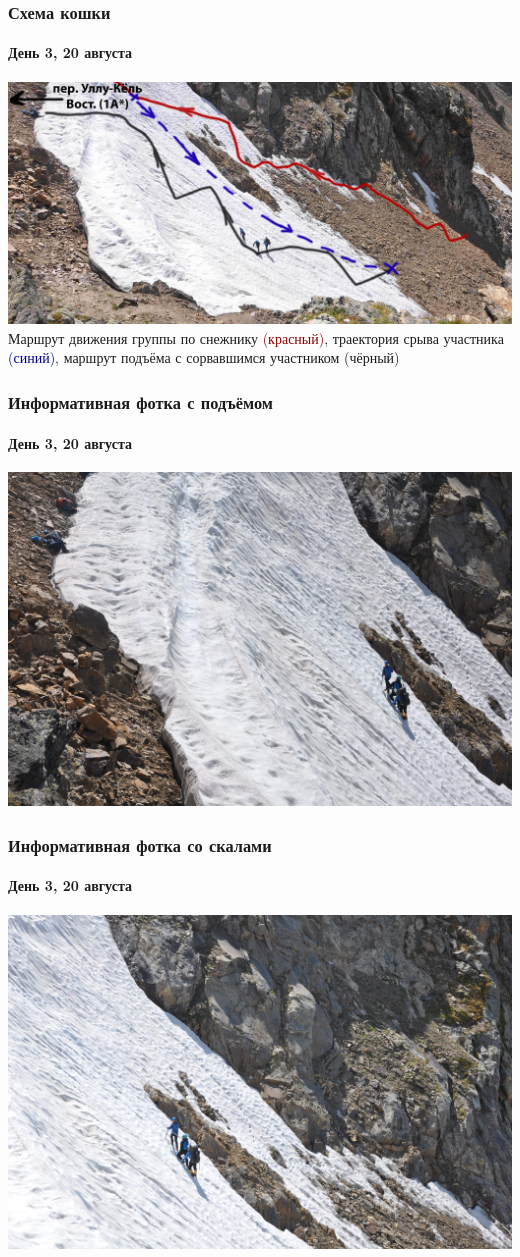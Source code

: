 \begin{frame}
	\frametitle{Схема кошки}
	\framesubtitle{День 3, 20 августа}
	\centering
	\includegraphics[width=\textwidth]{../pics/DSC_0946}			
	Маршрут движения группы по снежнику \textcolor{darkred}{(красный)}, траектория срыва участника \textcolor{darkblue}{(синий)}, маршрут подъёма с сорвавшимся участником (чёрный)
\end{frame}

\begin{frame}
	\frametitle{Информативная фотка с подъёмом}
	\framesubtitle{День 3, 20 августа}
	\centering
	\includegraphics[width=\textwidth]{../pics/DSC_0968}			
\end{frame}

\begin{frame}
	\frametitle{Информативная фотка со скалами}
	\framesubtitle{День 3, 20 августа}
	\centering
	\includegraphics[width=\textwidth]{../pics/DSC_0969}			
\end{frame}